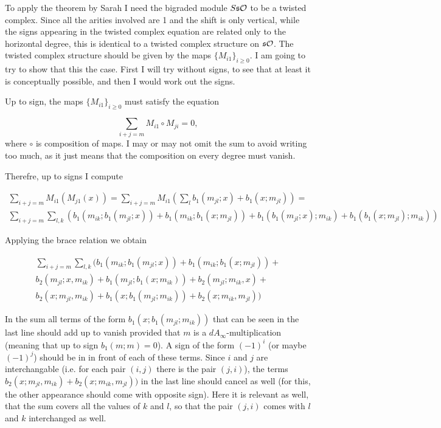 \documentclass[twoside]{article}
\begin{document}
To apply the theorem by Sarah I need the bigraded module $S\mathfrak{s}{\mathcal O}$ to be a twisted complex. Since all the arities involved are 1 and the shift is only vertical, while the signs appearing in the twisted complex equation are related only to the horizontal degree, this is identical to a twisted complex structure on $\mathfrak{s}{\mathcal O}$. The twisted complex structure should be given by the maps $\{M_{i1}\}_{i\geq 0}$. I am going to try to show that this the case. First I will try without signs, to see that at least it is conceptually possible, and  then I would work out the signs.

Up to sign, the maps  $\{M_{i1}\}_{i\geq 0}$ must satisfy the equation

\[\sum_{i+j=m} M_{i1}\circ M_{ji}=0,\]
where $\circ$ is composition of maps. I may or may not omit the sum to avoid writing too much, as it just means that the composition on every degree must vanish.

Therefre, up to signs I compute 

\begin{align*}
\sum_{i+j=m}M_{i1}(M_{j1}(x))=\sum_{i+j=m}M_{i1}\left(\sum_l b_1(m_{jl};x)+b_1(x;m_{jl})\right)=\\
\sum_{i+j=m}\sum_{l,k}\left(b_1(m_{ik}; b_1(m_{jl};x))+b_1(m_{ik};b_1(x;m_{jl}))+b_1(b_1(m_{jl};x);m_{ik})+b_1(b_1(x;m_{jl});m_{ik})\right)
\end{align*}

%

Applying the brace relation we obtain

\begin{align*}
\sum_{i+j=m}\sum_{l,k}(b_1(m_{ik}; b_1(m_{jl};x))+b_1(m_{ik};b_1(x;m_{jl}))+\\
 b_2(m_{jl};x,m_{ik})+b_1(m_{jl};b_1(x;m_{ik}))+b_2(m_{jl};m_{ik},x)+\\
b_2(x;m_{jl},m_{ik})+b_1(x;b_1(m_{jl};m_{ik}))+b_2(x;m_{ik},m_{jl}))
\end{align*}

In the sum all terms of the form $b_1(x;b_1(m_{jl};m_{ik}))$ that can be seen in the last line should add up to vanish provided that $m$ is a $dA_\infty$-multiplication (meaning that up to sign $b_1(m;m)=0$). A sign of the form $(-1)^i$ (or maybe $(-1)^j$) should be in in front of each of these terms. Since $i$ and $j$ are interchangable (i.e. for each pair $(i,j)$ there is the pair $(j,i)$), the terms $b_2(x;m_{jl},m_{ik})+b_2(x;m_{ik},m_{jl}))$ in the last line should cancel as well (for this, the other appearance should come with opposite sign). Here it is relevant as well, that the sum covers all the values of $k$ and $l$, so that the pair $(j,i)$ comes with $l$ and $k$ interchanged as well. 
\end{document}
